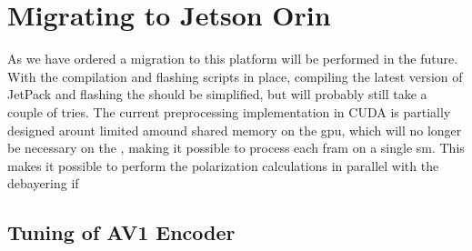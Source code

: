 \section{Migrating to Jetson Orin}
As we have ordered a \jo migration to this platform will be performed in the future.
With the compilation and flashing scripts in place, compiling the latest version of JetPack and flashing the \jo should be simplified, but will probably still take a couple of tries.
The current preprocessing implementation in CUDA is partially designed arount limited amound shared memory on the \jx \gls{gpu}, which will no longer be necessary on the \jo, making it possible to process each fram on a single \gls{sm}.
This makes it possible to perform the polarization calculations in parallel with the debayering if

\subsection{Tuning of AV1 Encoder}


